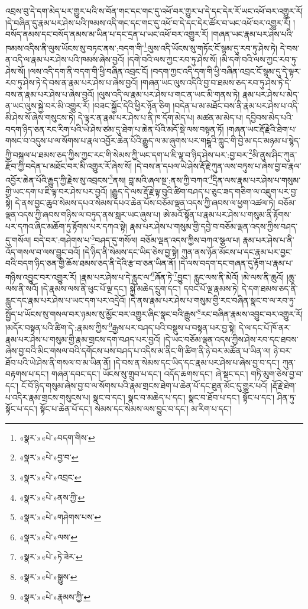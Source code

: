 འབྲས་བུ་དེ་དག་མེད་པར་གྱུར་པའི་ས་བོན་གང་དང་གང་དུ་འཕོ་བར་གྱུར་པ་དེ་དང་དེར་རོ་ཡང་འཕོ་བར་འགྱུར་རོ། །དེ་བཞིན་དུ་རྣམ་པར་ཤེས་པའི་ཁམས་འདི་གང་དང་གང་དུ་འཕོ་བ་དེ་དང་དེར་ཚོར་བ་ཡང་འཕོ་བར་འགྱུར་རོ། །བསོད་ནམས་དང་བསོད་ནམས་མ་ཡིན་པ་དང་དྲན་པ་ཡང་འཕོ་བར་འགྱུར་རོ། །གཞན་ཡང་རྣམ་པར་ཤེས་པའི་ཁམས་འདིས་ནི་ལུས་ཡོངས་སུ་བཏང་ནས་:བདག་གི་\footnote{«སྣར་»«པེ་»བདག་གིས་}ལུས་འདི་ཡོངས་སུ་གཏོང་ངོ་སྙམ་དུ་རབ་ཏུ་ཤེས་ཏེ། དེ་བས་ན་འདི་ལ་རྣམ་པར་ཤེས་པའི་ཁམས་ཞེས་བྱའོ། །དགེ་བའི་ལས་ཀྱང་རབ་ཏུ་ཤེས་སོ། །མི་དགེ་བའི་ལས་ཀྱང་རབ་ཏུ་ཤེས་སོ། །ལས་འདི་དག་ནི་བདག་གི་ཕྱི་བཞིན་འབྲང་ངོ། །བདག་ཀྱང་འདི་དག་གི་ཕྱི་བཞིན་འབྲང་ངོ་སྙམ་དུ་དེ་ལྟར་རབ་ཏུ་ཤེས་ཏེ་དེ་བས་ན་རྣམ་པར་ཤེས་པ་ཞེས་བྱའོ། །གཞན་ཡང་ལུས་འདིའི་བྱ་བ་ཐམས་ཅད་རབ་ཏུ་ཤེས་ཏེ་དེ་བས་ན་རྣམ་པར་ཤེས་པ་ཞེས་བྱའོ། །ལུས་འདི་ལ་རྣམ་པར་ཤེས་པ་གང་ན་ཡང་མི་གནས་ཏེ། རྣམ་པར་ཤེས་པ་མེད་ན་ཡང་ལུས་སྐྱེ་བར་མི་འགྱུར་རོ། །བཟང་སྐྱོང་དེའི་ཕྱིར་ཉོན་ཅིག །བདེན་པ་མ་མཐོང་བས་ནི་རྣམ་པར་ཤེས་པ་འདི་མི་ཤེས་སོ་ཞེས་གསུངས་ཏེ། དེ་ལྟར་ན་རྣམ་པར་ཤེས་པ་ནི་ཁ་དོག་མེད་པ། མཚན་མ་མེད་པ། དབྱིབས་མེད་པའི་བདག་ཉིད་ཅན་རང་རིག་པའི་ཡེ་ཤེས་ཙམ་དུ་ཐེག་པ་ཆེན་པོའི་མདོ་སྡེ་ལས་བསྟན་ཏོ། །གཞན་ཡང་རྡོ་རྗེའི་ཐེག་པ་གསང་བ་འདུས་པ་ལ་སོགས་པ་རྣལ་འབྱོར་ཆེན་པོའི་རྒྱུད་ལ་མ་ཞུགས་པར་གངྒཱའི་ཀླུང་གི་བྱེ་མ་དང་མཉམ་པ་སྙེད་ཀྱི་བསྐལ་པ་ཐམས་ཅད་ཀྱིས་ཀྱང་རང་གི་སེམས་ཀྱི་ཡང་དག་པ་ཇི་ལྟ་བ་ཉིད་ཤེས་པར་:བྱ་བར་\footnote{«སྣར་»«པེ་»བྱ་བ་}མི་ནུས་ཤིང་ཀུན་རྫོབ་ཀྱི་བདེན་པ་མཐོང་བར་མི་འགྱུར་རོ་ཞེས་སོ། །དེ་བས་ན་དཔལ་ཡེ་ཤེས་རྡོ་རྗེ་ཀུན་ལས་བཏུས་པ་ཞེས་བྱ་བ་རྣལ་འབྱོར་ཆེན་པོའི་རྒྱུད་ཀྱི་རྗེས་སུ་འབྲངས་\footnote{«སྣར་»«པེ་»འབྲང་}ནས། བླ་མའི་ཞལ་སྔ་:ནས་ཀྱི་བཀའ་\footnote{«སྣར་»«པེ་»ནས་ཀྱི་}དྲིན་ལས་རྣམ་པར་ཤེས་པ་གསུམ་གྱི་ཡང་དག་པ་ཇི་ལྟ་བར་ཤེས་པར་བྱའོ། །རྒྱུད་དེ་ལས་རྡོ་རྗེ་ལྟ་བུའི་ཚིག་བཤད་པ་ཅུང་ཟད་གཅིག་ལ་འཇུག་པར་བྱ་སྟེ། དེ་ནས་བྱང་ཆུབ་སེམས་དཔའ་སེམས་དཔའ་ཆེན་པོས་བཅོམ་ལྡན་འདས་ཀྱི་ཞབས་ལ་ཕྱག་འཚལ་ཏེ། བཅོམ་ལྡན་འདས་ཀྱི་ཞབས་གཉིས་ལ་བཏུད་ནས་སླར་ཡང་ཞུས་པ། ཨེ་མའོ་སྟོན་པ་རྣམ་པར་ཤེས་པ་གསུམ་ནི་རྟོགས་པར་དཀའ་ཞིང་མཆོག་ཏུ་རྟོགས་པར་དཀའ་སྟེ། རྣམ་པར་ཤེས་པ་གསུམ་གྱི་དབྱེ་བ་བཅོམ་ལྡན་འདས་ཀྱིས་བཤད་དུ་གསོལ། བདེ་བར་:གཤེགས་པ་\footnote{«སྣར་»«པེ་»གཤེགས་པས་}བཤད་དུ་གསོལ། བཅོམ་ལྡན་འདས་ཀྱིས་བཀའ་སྩལ་པ། རྣམ་པར་ཤེས་པ་ནི་འོད་གསལ་བ་ལས་བྱུང་བའོ། །དེ་ཉིད་ནི་སེམས་དང་ཡིད་ཅེས་བྱ་སྟེ། ཀུན་ནས་ཉོན་མོངས་པ་དང་རྣམ་པར་བྱང་བའི་བདག་ཉིད་ཅན་གྱི་ཆོས་ཐམས་ཅད་ནི་དེའི་རྩ་བ་ཅན་ཡིན་ནོ། །དེ་ལས་བདག་དང་གཞན་དུ་རྟོག་པ་རྣམ་པ་གཉིས་འབྱུང་བར་འགྱུར་རོ། །རྣམ་པར་ཤེས་པ་དེ་རླུང་ལ་\footnote{«སྣར་»«པེ་»ལས་}ཞོན་ཏེ་\footnote{«སྣར་»«པེ་»ཏེ་ཟེར་}བྱུང་། རླུང་ལས་ནི་མེའོ། །མེ་ལས་ནི་ཆུའོ། །ཆུ་ལས་ནི་སའོ། །དེ་རྣམས་ལས་ནི་ཕུང་པོ་ལྔ་དང་། སྐྱེ་མཆེད་དྲུག་དང་། དབང་པོ་ལྔ་རྣམས་ཏེ། དེ་དག་ཐམས་ཅད་ནི་རླུང་དང་རྣམ་པར་ཤེས་པ་ཡང་དག་པར་འདྲེའོ། །དེ་ནས་རྣམ་པར་ཤེས་པ་གསུམ་གྱི་རང་བཞིན་སྣང་བ་ལ་རབ་ཏུ་སྤྱོད་པ་ཡོངས་སུ་གསལ་བར་ཉམས་སུ་མྱོང་བར་འགྱུར་ཞིང་སྣང་བའི་རྒྱུས་\footnote{«སྣར་»«པེ་»སྒྱུས་}རང་བཞིན་རྣམས་འབྱུང་བར་འགྱུར་རོ། །མདོར་བསྟན་པའི་ཚིག་དེ་:རྣམས་ཀྱིས་\footnote{«སྣར་»«པེ་»རྣམས་ཀྱི་}རྒྱས་པར་བཤད་པའི་བསྡུས་པ་བསྟན་པར་བྱ་སྟེ། དེ་ལ་དང་པོ་ཁོ་ནར་རྣམ་པར་ཤེས་པ་གསུམ་གྱི་རྣམ་གྲངས་དག་བཤད་པར་བྱའོ། །དེ་ཡང་བཅོམ་ལྡན་འདས་ཀྱིས་ཤེས་རབ་དང་ཐབས་ཞེས་བྱ་བའི་མིང་གསལ་བའི་དགོངས་པས་བཤད་པ་འདིས་མ་ནིང་གི་ཚིག་ནི་ཉེ་བར་མཚོན་པ་ཡིན་ལ། ཉེ་བར་ཐོབ་པའི་ཡེ་ཤེས་ནི་གསལ་བ་མ་ཡིན་ནོ། །དེ་བས་ན་སེམས་དང་ཡིད་དང་རྣམ་པར་ཤེས་པ་ཞེས་བྱ་བ་དང་། ཀུན་བརྟགས་པ་དང་། གཞན་དབང་དང་། ཡོངས་སུ་གྲུབ་པ་དང་། འདོད་ཆགས་དང་། ཞེ་སྡང་དང་། གཏི་མུག་ཅེས་བྱ་བ་དང་། ངོ་བོ་ཉིད་གསུམ་ཞེས་བྱ་བ་ལ་སོགས་པའི་རྣམ་གྲངས་ཐེག་པ་ཆེན་པོ་དང་ཐུན་མོང་དུ་གྱུར་པའོ། །རྡོ་རྗེ་ཐེག་པ་འདིར་རྣམ་གྲངས་གསུངས་པ། སྣང་བ་དང་། སྣང་བ་མཆེད་པ་དང་། སྣང་བ་ཐོབ་པ་དང་། སྟོང་པ་དང་། ཤིན་ཏུ་སྟོང་པ་དང་། སྟོང་པ་ཆེན་པོ་དང་། སེམས་དང་སེམས་ལས་བྱུང་བ་དང་། མ་རིག་པ་དང་། 